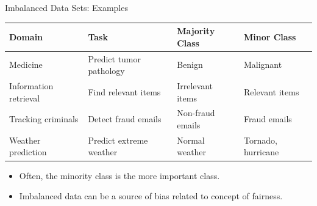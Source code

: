 \documentclass[11pt,compress,t,notes=noshow, aspectratio=169, xcolor=table]{beamer}
\begin{document}
\begin{frame}{Imbalanced Data Sets: Examples}
    \small
    \begin{table}[h]
        \scriptsize
        \centering
        \begin{tabular}{llll}
            \toprule
            \textbf{Domain} & \textbf{Task} & \textbf{Majority Class} & \textbf{Minor Class} \\ [5pt]
            \hline
            Medicine & Predict tumor pathology & Benign &  Malignant \\ [5pt]
            Information retrieval & Find relevant items & Irrelevant items & Relevant items \\ [5pt]
            Tracking criminals & Detect fraud emails & Non-fraud emails & Fraud emails \\ [5pt]
            Weather prediction & Predict extreme weather & Normal weather & Tornado, hurricane \\
            \hline
        \end{tabular}
    \end{table}
    
	\begin{itemize}
        \item Often, the minority class is the more important class.
        \item Imbalanced data can be a source of bias related to concept of fairness. %
	\end{itemize}

\end{frame}
\end{document}
